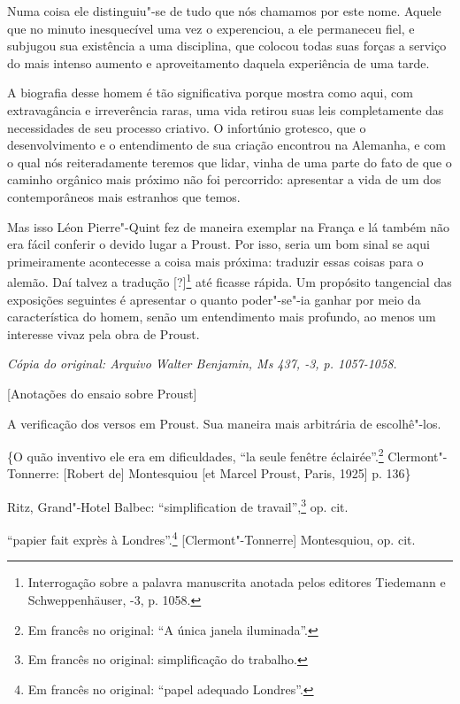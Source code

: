 Numa coisa ele distinguiu"-se de tudo que nós chamamos por este nome.
Aquele que no minuto inesquecível uma vez o experenciou, a ele
permaneceu fiel, e subjugou sua existência a uma disciplina, que colocou
todas suas forças a serviço do mais intenso aumento e aproveitamento
daquela experiência de uma tarde.

A biografia desse homem é tão significativa porque mostra como aqui, com
extravagância e irreverência raras, uma vida retirou suas leis
completamente das necessidades de seu processo criativo. O infortúnio
grotesco, que o desenvolvimento e o entendimento de
sua criação encontrou na Alemanha, e com o qual nós reiteradamente
teremos que lidar, vinha de uma parte do fato de que o caminho orgânico
mais próximo não foi percorrido: apresentar a vida de um dos
contemporâneos mais estranhos que temos.

Mas isso Léon Pierre"-Quint fez de maneira exemplar na França e lá também
não era fácil conferir o devido lugar a Proust. Por isso, seria um bom
sinal se aqui primeiramente acontecesse a coisa mais próxima: traduzir
essas coisas para o alemão. Daí talvez a tradução {[}?{]}\footnote{Interrogação sobre a palavra manuscrita anotada pelos editores
  Tiedemann e Schweppenhäuser, -3, p. 1058. \versal{[N. T.]}} até ficasse
rápida. Um propósito tangencial das exposições seguintes é apresentar o
quanto poder"-se"-ia ganhar por meio da característica do homem, senão um
entendimento mais profundo, ao menos um interesse vivaz pela obra de
Proust.


\begin{flushright}
\emph{\small{Cópia do original: Arquivo Walter Benjamin, Ms 437, -3, p. 1057-1058.}}
\end{flushright}

{[}Anotações do ensaio sobre Proust{]}

A verificação dos versos em Proust. Sua maneira mais arbitrária de
escolhê"-los.

\{O quão inventivo ele era em dificuldades, ``la seule fenêtre
éclairée''.\footnote{Em francês no original: ``A única janela iluminada''. \versal{[N. T.]}}
Clermont"-Tonnerre: {[}Robert de{]} Montesquiou {[}et Marcel Proust,
Paris, 1925{]} p. 136\}

Ritz, Grand"-Hotel Balbec: ``simplification de travail'',\footnote{Em francês no original: simplificação do trabalho. \versal{[N. T.]}} op. cit.

``papier fait exprès à Londres''.\footnote{Em francês no original: ``papel adequado
  Londres''. \versal{[N. T.]}} {[}Clermont"-Tonnerre{]} Montesquiou, op. cit.

